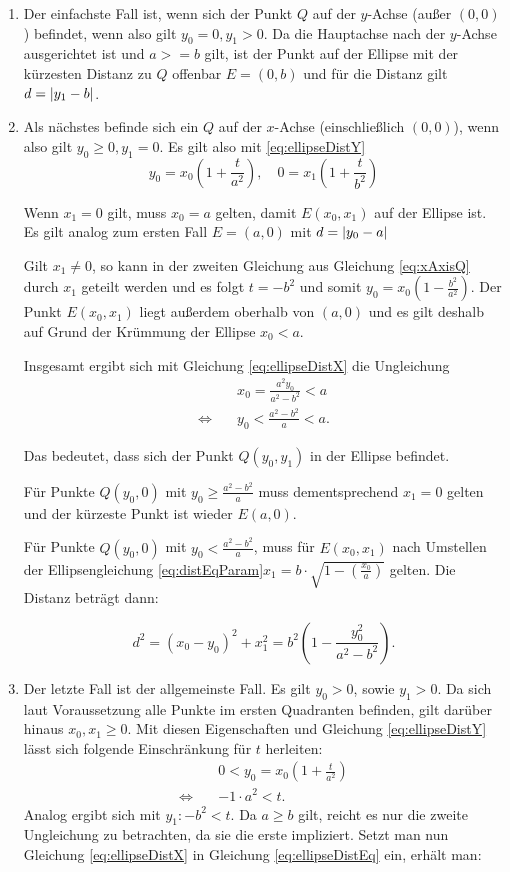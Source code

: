 \begin{enumerate}
	\item Der einfachste Fall ist, wenn sich der Punkt $Q$ auf der $y$-Achse (außer $(0,0)$) befindet, wenn also gilt $y_0 = 0, y_1 > 0$.
	Da die Hauptachse nach der $y$-Achse ausgerichtet ist und $a >= b$ gilt, ist der Punkt auf der Ellipse mit der kürzesten Distanz zu $Q$ offenbar $E = (0, b)$ und für die Distanz gilt $d = \lvert y_1 - b\rvert$.
	\item Als nächstes befinde sich ein $Q$ auf der $x$-Achse (einschließlich $(0,0)$), wenn also gilt  $y_0 \geq 0, y_1 = 0$. Es gilt also mit \ref{eq:ellipseDistY}
	\begin{equation} \label{eq:xAxisQ}	
		y_0 = x_0\left(1 + \frac{t}{a^2}\right), \quad 0 = x_1\left(1 + \frac{t}{b^2}\right)
	\end{equation}

	Wenn $x_1 = 0$ gilt, muss $x_0 = a$ gelten, damit $E(x_0,x_1)$ auf der Ellipse ist. Es  gilt analog zum ersten Fall $E=(a,0)$ mit $d = \lvert y_0 - a\rvert$

	Gilt $x_1 \neq 0$, so kann in der zweiten Gleichung aus Gleichung \ref{eq:xAxisQ} durch $x_1$ geteilt werden und es folgt $t = -b^2$ und somit $y_0 = x_0\left(1 - \frac{b^2}{a^2}\right)$. Der Punkt $E(x_0,x_1)$ liegt außerdem oberhalb von $(a,0)$ und es gilt deshalb auf Grund der Krümmung der Ellipse $x_0 < a$.

	Insgesamt ergibt sich mit Gleichung \ref{eq:ellipseDistX} die Ungleichung
	\[
	\begin{aligned}
		&x_0 = \frac{a^2y_0}{a^2 - b^2} < a \\
		\Leftrightarrow\quad &y_0 < \frac{a^2 - b^2}{a} < a.
	\end{aligned}
	\]

	Das bedeutet, dass sich der Punkt $Q(y_0,y_1)$ in der Ellipse befindet.

	Für Punkte $Q(y_0,0)$ mit $y_0 \geq \frac{a^2 - b^2}{a}$ muss dementsprechend $x_1 = 0$ gelten und der kürzeste Punkt ist wieder $E(a,0)$.

	Für Punkte $Q(y_0,0)$ mit $y_0 < \frac{a^2 - b^2}{a}$, muss für $E(x_0,x_1)$ nach Umstellen der Ellipsengleichung \ref{eq:distEqParam}\quad$x_1 = b\cdot\sqrt{1-\left(\frac{x_0}{a}\right)}$ gelten.
	Die Distanz beträgt dann:

	\[
		d^2 = (x_0 - y_0)^2 + x_1^2 = b^2\left(1 - \frac{y_0^2}{a^2 - b^2}\right).
	\]
	\item Der letzte Fall ist der allgemeinste Fall. Es gilt $y_0 > 0$, sowie $y_1 > 0$. Da sich laut Voraussetzung alle Punkte im ersten Quadranten befinden, gilt darüber hinaus $x_0, x_1 \geq 0$. Mit diesen Eigenschaften und Gleichung \ref{eq:ellipseDistY} lässt sich folgende Einschränkung für $t$ herleiten:
\[
	\begin{aligned}
	& 0 < y_0 = x_0\left(1 + \frac{t}{a^2}\right)\\
	\Leftrightarrow\quad& -1\cdot a^2 < t.
	\end{aligned}
\]
	Analog ergibt sich mit $y_1\colon -b^2 < t$. Da $a\geq b$ gilt, reicht es nur die zweite Ungleichung zu betrachten, da sie die erste impliziert. Setzt man nun Gleichung \ref{eq:ellipseDistX} in Gleichung \ref{eq:ellipseDistEq} ein, erhält man:


\end{enumerate}
